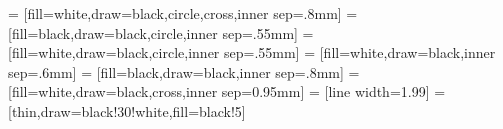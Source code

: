 

   = [fill=white,draw=black,circle,cross,inner sep=.8mm]
   = [fill=black,draw=black,circle,inner sep=.55mm]
   = [fill=white,draw=black,circle,inner sep=.55mm]
   = [fill=white,draw=black,inner sep=.6mm]
     = [fill=black,draw=black,inner sep=.8mm]
     = [fill=white,draw=black,cross,inner sep=0.95mm]
 = [line width=1.99]
   = [thin,draw=black!30!white,fill=black!5]

\newcommand{\nset}{{\Omega^d_n}}\label{sec:nset}

